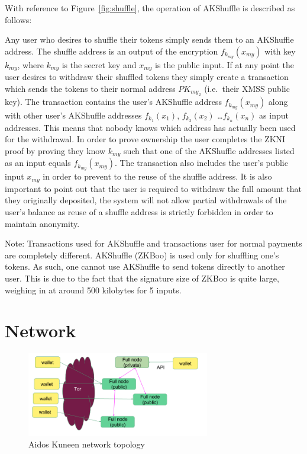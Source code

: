 \documentclass[a4paper,10pt,twocolumn]{article}
\begin{document}
	\vspace{-3.5mm}
	
	With reference to Figure~\ref{fig:shuffle}, the operation of AKShuffle is described as follows:
	\vspace{2.5mm}
	
	Any user who desires to shuffle their tokens simply sends them to an AKShuffle address.
	The shuffle address is an output of the encryption \( f_{k_{my}}(x_{my}) \) with key \( k_{my} \),  
	where \(k_{my}\) is the secret key  and \(x_{my}\) is the public input.
	If at any point the user desires to withdraw their shuffled tokens they simply create a transaction which sends the tokens to their 
	normal address \(PK_{my_2}\) (i.e.\ their XMSS public key).
	The transaction contains the user's AKShuffle address \( f_{k_{my}}(x_{my}) \) along with other user's AKShuffle addresses 
	\( f_{k_{1}}(x_{1}) \), \( f_{k_{2}}(x_{2}) \) \dots \( f_{k_{n}}(x_{n}) \) as input addresses. 
	This means that nobody knows which address has actually been used for the withdrawal. 
	In order to prove ownership the user completes the ZKNI proof by proving they know \( k_{my} \) such that one of the AKShuffle 
	addresses listed as an input equals \( f_{k_{my}}(x_{my}) \). 
	The transaction also includes the user's public input \( x_{my} \) in order to prevent to the reuse of the shuffle address. It is also 
	important to point out that the user is required to withdraw the full amount that they originally deposited, 
	the system will not allow partial withdrawals of the user's balance as reuse of a shuffle address is strictly forbidden in order to maintain anonymity.
	
	\vspace{2.5mm}
	
	Note: Transactions used for AKShuffle and transactions user for normal payments are completely different. AKShuffle (ZKBoo) is used 
	only for shuffling one's tokens. As such, one cannot use AKShuffle to send tokens directly to another user. This is due to the fact 
	that the signature size of ZKBoo is quite large, weighing in at around 500 kilobytes for 5 inputs.
	
	\newpage
	
	\section{Network}
	\label{sec:network}
	
	\begin{figure}[ht]
		\begin{center}
		\includegraphics[width=80mm]{network.png}
		  \caption{Aidos Kuneen network topology}
		\label{fig:network}
		\end{center}
	 \end{figure}
	
\end{document}
